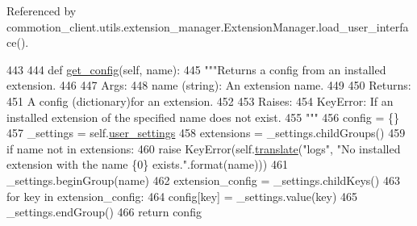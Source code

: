 Referenced by commotion\-\_\-client.\-utils.\-extension\-\_\-manager.\-Extension\-Manager.\-load\-\_\-user\-\_\-interface().


\begin{DoxyCode}
443 
444     \textcolor{keyword}{def }\hyperlink{classcommotion__client_1_1utils_1_1extension__manager_1_1ExtensionManager_a7f811f5c953b4208d9af942c9c173dbf}{get\_config}(self, name):
445         \textcolor{stringliteral}{"""Returns a config from an installed extension.}
446 \textcolor{stringliteral}{                }
447 \textcolor{stringliteral}{        Args:}
448 \textcolor{stringliteral}{          name (string): An extension name.}
449 \textcolor{stringliteral}{        }
450 \textcolor{stringliteral}{        Returns:}
451 \textcolor{stringliteral}{          A config (dictionary)for an extension.}
452 \textcolor{stringliteral}{        }
453 \textcolor{stringliteral}{        Raises:}
454 \textcolor{stringliteral}{          KeyError: If an installed extension of the specified name does not exist.}
455 \textcolor{stringliteral}{        """}
456         config  = \{\}
457         \_settings = self.\hyperlink{classcommotion__client_1_1utils_1_1extension__manager_1_1ExtensionManager_a0fa8b2be1171ded73629a01c50472d34}{user\_settings}
458         extensions  = \_settings.childGroups()
459         \textcolor{keywordflow}{if} name \textcolor{keywordflow}{not} \textcolor{keywordflow}{in} extensions:
460             \textcolor{keywordflow}{raise} KeyError(self.\hyperlink{classcommotion__client_1_1utils_1_1extension__manager_1_1ExtensionManager_a2cfd032ca383c3fd6f0f52b99b6dd67c}{translate}(\textcolor{stringliteral}{"logs"}, \textcolor{stringliteral}{"No installed extension with the name \{0\}
       exists."}.format(name)))
461         \_settings.beginGroup(name)
462         extension\_config = \_settings.childKeys()
463         \textcolor{keywordflow}{for} key \textcolor{keywordflow}{in} extension\_config:
464             config[key] = \_settings.value(key)
465         \_settings.endGroup()
466         \textcolor{keywordflow}{return} config

\end{DoxyCode}
